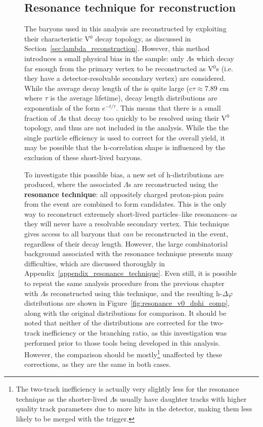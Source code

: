 \begin{figure}
\subsection{Resonance technique for \lmb reconstruction}
\label{sec:resonance_technique}

The \lmb baryons used in this analysis are reconstructed by exploiting their characteristic V$^0$ decay topology, as discussed in Section~\ref{sec:lambda_reconstruction}. However, this method introduces a small physical bias in the \lmb sample: only $\Lambda$s which decay far enough from the primary vertex to be reconstructed as V$^0$s (i.e. they have a detector-resolvable secondary vertex) are considered. While the average decay length of the \lmb is quite large (c$\tau \approx 7.89$ cm where $\tau$ is the average lifetime), decay length distributions are exponentials of the form $e^{-t/\tau}$. This means that there is a small fraction of $\Lambda$s that decay too quickly to be resolved using their V$^0$ topology, and thus are not included in the analysis. While the the single particle \lmb efficiency is used to correct for the overall \lmb yield, it may be possible that the h-\lmb correlation shape is influenced by the exclusion of these short-lived \lmb baryons. 

To investigate this possible bias, a new set of h-\lmb distributions are produced, where the associated $\Lambda$s are reconstructed using the \textbf{resonance technique}: all oppositely charged proton-pion pairs from the event are combined to form \lmb candidates. This is the only way to reconstruct extremely short-lived particles--like resonances--as they will never have a resolvable secondary vertex.  This technique gives access to all \lmb baryons that \textit{can} be reconstructed in the event, regardless of their decay length. However, the large combinatorial background associated with the resonance technique presents many difficulties, which are discussed thoroughly in Appendix~\ref{appendix_resonance_technique}. Even still, it is possible to repeat the same analysis procedure from the previous chapter with $\Lambda$s reconstructed using this technique, and the resulting h-\lmb $\Delta\varphi$ distributions are shown in Figure~\ref{fig:resonance_v0_dphi_comp}, along with the original distributions for comparison. It should be noted that neither of the distributions are corrected for the two-track inefficiency or the branching ratio, as this investigation was performed prior to those tools being developed in this analysis. However, the comparison should be mostly\footnote{The two-track inefficiency is actually very slightly less for the resonance technique as the shorter-lived $\Lambda$s usually have daughter tracks with higher quality track parameters due to more hits in the detector, making them less likely to be merged with the trigger.} unaffected by these corrections, as they are the same in both cases.


\end{figure}

